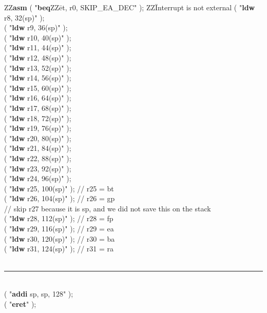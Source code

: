 \begin{center}
\begin{minipage}[t]{12.5 cm}
\begin{tabbing}
ZZ\={\bf asm} ( "{\bf beq}ZZ\=et, r0, SKIP\_EA\_DEC" ); ZZ\= Interrupt is not external\kill 
{} (	"{\bf ldw}	\>r8,  32(sp)" );\\
 (	"{\bf ldw}	\>r9,  36(sp)" );\\
 (	"{\bf ldw}	\>r10, 40(sp)" );\\
 (	"{\bf ldw}	\>r11, 44(sp)" );\\
 (	"{\bf ldw}	\>r12, 48(sp)" );\\
 (	"{\bf ldw}	\>r13, 52(sp)" );\\
 (	"{\bf ldw}	\>r14, 56(sp)" );\\
 (	"{\bf ldw}	\>r15, 60(sp)" );\\
 (	"{\bf ldw}	\>r16, 64(sp)" );\\
 (	"{\bf ldw}	\>r17, 68(sp)" );\\
 (	"{\bf ldw}	\>r18, 72(sp)" );\\
 (	"{\bf ldw}	\>r19, 76(sp)" );\\
 (	"{\bf ldw}	\>r20, 80(sp)" );\\
 (	"{\bf ldw}	\>r21, 84(sp)" );\\
 (	"{\bf ldw}	\>r22, 88(sp)" );\\
 (	"{\bf ldw}	\>r23, 92(sp)" );\\
 (	"{\bf ldw}	\>r24, 96(sp)" );\\
 (	"{\bf ldw}	\>r25, 100(sp)" ); \>// r25 = bt\\
 (	"{\bf ldw}	\>r26, 104(sp)" ); \>// r26 = gp\\
\>// skip r27 because it is sp, and we did not save this on the stack\\
 (	"{\bf ldw}	\>r28, 112(sp)" ); \>// r28 = fp\\
 (	"{\bf ldw}	\>r29, 116(sp)" ); \>// r29 = ea\\
 (	"{\bf ldw}	\>r30, 120(sp)" ); \>// r30 = ba\\
 (	"{\bf ldw}	\>r31, 124(sp)" ); \>// r31 = ra\\
~\rule{6.0in}{0in}~\\
 (	"{\bf addi}	\>sp, sp, 128" );\\
 (	"{\bf eret}" );\\

\end{tabbing}
\end{minipage}
\end{center}

